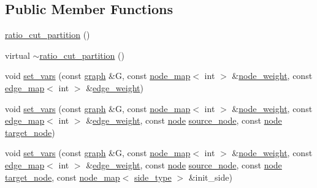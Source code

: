 \subsection*{Public Member Functions}
\begin{DoxyCompactItemize}
\item 
\mbox{\hyperlink{classratio__cut__partition_a56e283d4ec5a06115146982e86c65878}{ratio\+\_\+cut\+\_\+partition}} ()
\item 
virtual \mbox{\hyperlink{classratio__cut__partition_a5fe4f3a926fd07a1af46cce9acdbb849}{$\sim$ratio\+\_\+cut\+\_\+partition}} ()
\item 
void \mbox{\hyperlink{classratio__cut__partition_a4c143f82aac5fee3b955414ab7d6ce19}{set\+\_\+vars}} (const \mbox{\hyperlink{classgraph}{graph}} \&G, const \mbox{\hyperlink{classnode__map}{node\+\_\+map}}$<$ int $>$ \&\mbox{\hyperlink{classratio__cut__partition_a4d9d2a9317a062f839ea7155c37b173f}{node\+\_\+weight}}, const \mbox{\hyperlink{classedge__map}{edge\+\_\+map}}$<$ int $>$ \&\mbox{\hyperlink{classratio__cut__partition_a48a85c82fb09b83c9d494d6d1232fab2}{edge\+\_\+weight}})
\item 
void \mbox{\hyperlink{classratio__cut__partition_aacd519cdb1760af792e22d57e746c07f}{set\+\_\+vars}} (const \mbox{\hyperlink{classgraph}{graph}} \&G, const \mbox{\hyperlink{classnode__map}{node\+\_\+map}}$<$ int $>$ \&\mbox{\hyperlink{classratio__cut__partition_a4d9d2a9317a062f839ea7155c37b173f}{node\+\_\+weight}}, const \mbox{\hyperlink{classedge__map}{edge\+\_\+map}}$<$ int $>$ \&\mbox{\hyperlink{classratio__cut__partition_a48a85c82fb09b83c9d494d6d1232fab2}{edge\+\_\+weight}}, const \mbox{\hyperlink{classnode}{node}} \mbox{\hyperlink{classratio__cut__partition_abb18c3acafc590e258453d7a8d86bb49}{source\+\_\+node}}, const \mbox{\hyperlink{classnode}{node}} \mbox{\hyperlink{classratio__cut__partition_a343ba76869e64141fb795010e388744b}{target\+\_\+node}})
\item 
void \mbox{\hyperlink{classratio__cut__partition_a67ea2ccb8b5cce2e4acd8e10e112a962}{set\+\_\+vars}} (const \mbox{\hyperlink{classgraph}{graph}} \&G, const \mbox{\hyperlink{classnode__map}{node\+\_\+map}}$<$ int $>$ \&\mbox{\hyperlink{classratio__cut__partition_a4d9d2a9317a062f839ea7155c37b173f}{node\+\_\+weight}}, const \mbox{\hyperlink{classedge__map}{edge\+\_\+map}}$<$ int $>$ \&\mbox{\hyperlink{classratio__cut__partition_a48a85c82fb09b83c9d494d6d1232fab2}{edge\+\_\+weight}}, const \mbox{\hyperlink{classnode}{node}} \mbox{\hyperlink{classratio__cut__partition_abb18c3acafc590e258453d7a8d86bb49}{source\+\_\+node}}, const \mbox{\hyperlink{classnode}{node}} \mbox{\hyperlink{classratio__cut__partition_a343ba76869e64141fb795010e388744b}{target\+\_\+node}}, const \mbox{\hyperlink{classnode__map}{node\+\_\+map}}$<$ \mbox{\hyperlink{classratio__cut__partition_ace53442bd0c1e21fbf00858ec6f6b456}{side\+\_\+type}} $>$ \&init\+\_\+side)

\end{DoxyCompactItemize}
